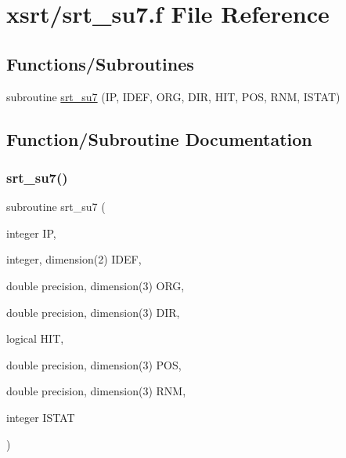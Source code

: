 \hypertarget{srt__su7_8f}{}\section{xsrt/srt\+\_\+su7.f File Reference}
\label{srt__su7_8f}
\subsection*{Functions/\+Subroutines}
\begin{DoxyCompactItemize}
\item 
subroutine \hyperlink{srt__su7_8f_a0c327a24cec1230497402d505f9a8d66}{srt\+\_\+su7} (IP, I\+D\+EF, O\+RG, D\+IR, H\+IT, P\+OS, R\+NM, I\+S\+T\+AT)
\end{DoxyCompactItemize}


\subsection{Function/\+Subroutine Documentation}
\mbox{\label{srt__su7_8f_a0c327a24cec1230497402d505f9a8d66}} 
\subsubsection{\texorpdfstring{srt\+\_\+su7()}{srt\_su7()}}
{\footnotesize\ttfamily subroutine srt\+\_\+su7 (\begin{DoxyParamCaption}\item[{integer}]{IP,  }\item[{integer, dimension(2)}]{I\+D\+EF,  }\item[{double precision, dimension(3)}]{O\+RG,  }\item[{double precision, dimension(3)}]{D\+IR,  }\item[{logical}]{H\+IT,  }\item[{double precision, dimension(3)}]{P\+OS,  }\item[{double precision, dimension(3)}]{R\+NM,  }\item[{integer}]{I\+S\+T\+AT }\end{DoxyParamCaption})}

